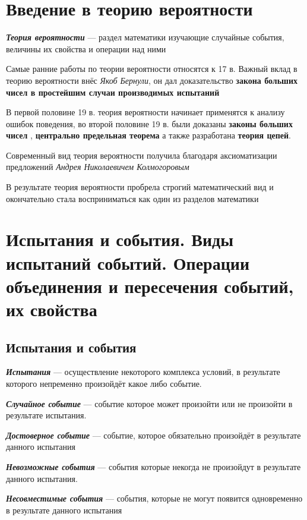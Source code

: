 \documentclass[a5paper]{article}
\begin{document}
	\section{Введение в теорию вероятности}
	
	\textbf{\textit{Теория вероятности}} --- раздел математики изучающие случайные события, величины их свойства и операции над ними

	Самые ранние работы по теории вероятности относятся к 17 в. Важный вклад в теорию вероятности внёс \textit{Якоб Бернули}, он дал доказательство \textbf{закона больших чисел в простейшим случаи производимых испытаний}
	
	В первой половине 19 в. теория вероятности начинает применятся к анализу ошибок поведения, во второй половине 19 в. были доказаны \textbf{законы больших чисел }, \textbf{центрально предельная теорема} а также разработана \textbf{теория цепей}. 
	
	Современный вид теория вероятности получила благодаря аксиоматизации предложений \textit{Андрея Николаевичем Колмогоровым} 
	
	В результате теория вероятности пробрела строгий математический вид и окончательно стала восприниматься как один из разделов математики
	
	\newpage
	\section{Испытания и события. Виды испытаний событий. Операции объединения и пересечения событий, их свойства}  	
	\subsection{Испытания и события}

	\textbf{\textit{Испытания}} --- осуществление некоторого комплекса условий, в результате которого непременно произойдёт какое либо событие. 

	\textbf{\textit{Случайное событие}} --- событие которое может произойти или не произойти в результате испытания.
	
	\textbf{\textit{Достоверное событие}} --- событие, которое обязательно произойдёт в результате данного испытания
	
	\textbf{\textit{Невозможные события}} --- события которые некогда не произойдут в результате данного испытания.
	
	\textbf{\textit{Несовместимые события}} --- события, которые не могут появится одновременно в результате данного испытания
	
\end{document}
